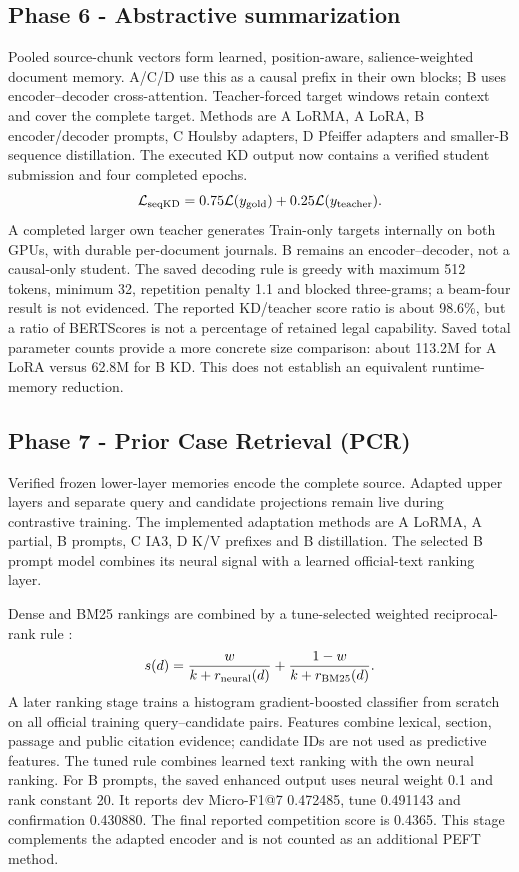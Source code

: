 \documentclass[11pt, oneside]{article}
\begin{document}
\subsection{Phase 6 - Abstractive summarization}
Pooled source-chunk vectors form learned, position-aware, salience-weighted document
memory. A/C/D use this as a causal prefix in their own blocks; B uses encoder--decoder
cross-attention. Teacher-forced target windows retain context and cover the complete
target. Methods are A LoRMA, A LoRA, B encoder/decoder prompts, C Houlsby adapters,
D Pfeiffer adapters and smaller-B sequence distillation. The executed KD output now
contains a verified student submission and four completed epochs.
\begin{equation}
\mathcal L_{\rm seqKD}=0.75\mathcal L(y_{\rm gold})+0.25\mathcal L(y_{\rm teacher}).
\end{equation}
A completed larger own teacher generates Train-only targets internally on both GPUs,
with durable per-document journals. B remains an encoder--decoder, not a causal-only
student. The saved decoding rule is greedy with maximum 512 tokens, minimum 32,
repetition penalty 1.1 and blocked three-grams; a beam-four result is not evidenced.
The reported KD/teacher score ratio is about 98.6\%, but a ratio of BERTScores is
not a percentage of retained legal capability. Saved total parameter counts provide
a more concrete size comparison: about 113.2M for A LoRA versus 62.8M for B KD.
This does not establish an equivalent runtime-memory reduction.

\subsection{Phase 7 - Prior Case Retrieval (PCR)}
Verified frozen lower-layer memories encode the complete source. Adapted upper layers
and separate query and candidate projections remain live during contrastive training.
The implemented adaptation methods are A LoRMA, A partial, B prompts, C IA3, D K/V
prefixes and B distillation. The selected B prompt model combines its neural signal
with a learned official-text ranking layer.

Dense and BM25  rankings are combined by a tune-selected
weighted reciprocal-rank rule \cite{cormack2009rrf}:
\begin{equation}
s(d)=\frac{w}{k+r_{\rm neural}(d)}+\frac{1-w}{k+r_{\rm BM25}(d)}.
\end{equation}
A later ranking stage trains a histogram gradient-boosted classifier from scratch
on all official training query--candidate pairs. Features combine lexical, section,
passage and public citation evidence; candidate IDs are not used as predictive features.
The tuned rule combines learned text ranking with the own neural ranking. For B prompts,
the saved enhanced output uses neural weight 0.1 and rank constant 20. It reports
dev Micro-F1@7 0.472485, tune 0.491143 and confirmation 0.430880. The final reported
competition score is 0.4365. This stage complements the adapted encoder and is not
counted as an additional PEFT method.
\end{document}
